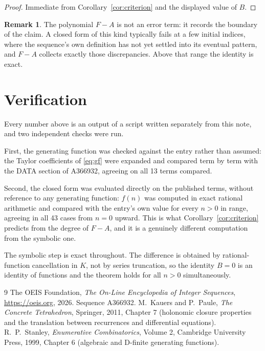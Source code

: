 \documentclass[11pt,a4paper]{article}
\theoremstyle{plain}
\theoremstyle{definition}
\newtheorem{remark}[theorem]{Remark}
\begin{document}
\begin{proof}
Immediate from Corollary~\ref{cor:criterion} and the displayed value of $B$.
\end{proof}

\begin{remark}
The polynomial $F-A$ is not an error term: it records the boundary of the claim. A closed
form of this kind typically fails at a few initial indices, where the sequence's own
definition has not yet settled into its eventual pattern, and $F-A$ collects exactly
those discrepancies. Above that range the identity is exact.
\end{remark}

\section{Verification}

Every number above is an output of a script written separately from this note, and two
independent checks were run.

First, the generating function was checked against the entry rather than assumed: the
Taylor coefficients of \eqref{eq:gf} were expanded and compared term by term with the DATA
section of A366932, agreeing on all 13 terms compared.

Second, the closed form was evaluated directly on the published terms, without reference
to any generating function: $f(n)$ was computed in exact rational arithmetic and compared
with the entry's own value for every $n>0$ in range, agreeing in all 43 cases
from $n=0$ upward. This is what Corollary~\ref{cor:criterion} predicts from the
degree of $F-A$, and it is a genuinely different computation from the symbolic one.

The symbolic step is exact throughout. The difference is obtained by rational-function
cancellation in $K$, not by series truncation, so the identity $B=0$ is an
identity of functions and the theorem holds for all $n>0$ simultaneously.

\begin{thebibliography}{9}
 The OEIS Foundation, \emph{The On-Line Encyclopedia of Integer Sequences},
\url{https://oeis.org}, 2026. Sequence A366932.
 M.~Kauers and P.~Paule, \emph{The Concrete Tetrahedron}, Springer, 2011,
Chapter 7 (holonomic closure properties and the translation between recurrences and
differential equations).
 R.~P.~Stanley, \emph{Enumerative Combinatorics}, Volume 2, Cambridge
University Press, 1999, Chapter 6 (algebraic and D-finite generating functions).
\end{thebibliography}
\end{document}
